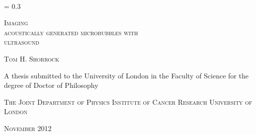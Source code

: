 


\newcommand*{\titleEI}{\begingroup%
\FSfont{5gl}%
\drop = 0.3\textheight
\vspace*{\drop}
\raggedright
{\LARGE {\huge C}ONUNDRUMS \textit{and} \\
\hspace*{30pt} {\huge E}NIGMAS\par}
\vspace{2\baselineskip}
{\large\ltseries\hspace*{15pt} {\LARGE T}WENTY {\LARGE Y}EARS \\[.1\baselineskip]
\hspace*{15pt} OF {\LARGE P}UZZLEMENTS}\par
\vspace{2\baselineskip}
\hspace*{15pt}{\ltseries \textit{\large {\footnotesize BY} The Author}}\par
\vfill
The Publisher {\footnotesize YEAR}
\endgroup}


\thispagestyle{empty}

\mbox{  }
\begin{center}
\drop = 0.3\textheight
\vspace*{\drop}
\vspace{10mm}
\LARGE
\raggedright
{\textsc{\hspace*{222pt}Imaging \\acoustically  generated microbubbles  {\large{with}}\\ \hspace*{195pt}ultrasound}}

\vspace{10mm}
\large
{\textsc{\hspace*{180pt}Tom H. Shorrock}}

\vspace{25mm}\vfill
\large
\hspace*{14pt}A thesis submitted to the University of London in the \linebreak
Faculty of Science for the degree of Doctor of Philosophy \linebreak
\vspace{20mm}\vfill


\vspace{2mm}
\large
{\textsc{\hspace*{85pt}The Joint Department of Physics  \linebreak
\hspace*{104pt}Institute of Cancer Research \linebreak
\hspace*{152pt}University of London
}}

\vspace{2mm}

\large
{\textsc{\hspace*{187pt}November 2012}}

\end{center}


